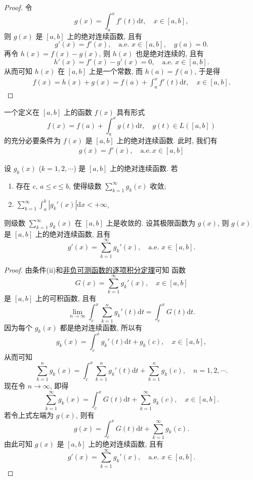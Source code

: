 \documentclass[../../main.tex]{subfiles}%
\begin{document}
\begin{proof}
令
\[
g(x) = \int_a^x f'(t)\mathrm{d}t,\quad x\in[a,b],
\]
则 $g(x)$ 是 $[a,b]$ 上的绝对连续函数, 且有
\[
g'(x) = f'(x),\quad \text{a.e. } x\in[a,b],\quad g(a)=0.
\]
再令 $h(x)=f(x)-g(x)$, 则 $h(x)$ 也是绝对连续的, 且有
\[
h'(x) = f'(x)-g'(x) = 0,\quad \text{a.e. } x\in[a,b].
\]
从而可知 $h(x)$ 在 $[a,b]$ 上是一个常数, 而 $h(a)=f(a)$, 于是得
\begin{align*}
f(x) = h(x)+g(x) 
= f(a) + \int_a^x f'(t)\mathrm{d}t,\quad x\in[a,b].
\end{align*}
\end{proof}

\begin{corollary}[Lebesgue微积分基本定理]\label{corollary:Lebesgue微积分基本定理}
一个定义在 $[a,b]$ 上的函数 $f(x)$ 具有形式
\[
f(x) = f(a) + \int_a^x g(t)\mathrm{d}t,\quad g(t)\in L([a,b])
\]
的充分必要条件为 $f(x)$ 是 $[a,b]$ 上的绝对连续函数. 此时, 我们有
\begin{align*}
g(x)=f' (x),\quad \mathrm{a}.\mathrm{e}.\,x\in [a,b]
\end{align*}
\end{corollary}

\begin{proposition}
设 $g_k(x)$ ($k=1,2,\cdots$) 是 $[a,b]$ 上的绝对连续函数. 若
\begin{enumerate}[(1)]
\item 存在 $c$, $a\leqslant c\leqslant b$, 使得级数 $\sum_{k=1}^\infty g_k(c)$ 收敛;
\item $\sum_{k=1}^\infty \int_a^b |g_k'(x)|\mathrm{d}x < +\infty$,
\end{enumerate}
则级数 $\sum_{k=1}^\infty g_k(x)$ 在 $[a,b]$ 上是收敛的. 设其极限函数为 $g(x)$, 则 $g(x)$ 是 $[a,b]$ 上的绝对连续函数, 且有
\[
g'(x) = \sum_{k=1}^\infty g_k'(x),\quad \text{a.e. } x\in[a,b].
\]
\end{proposition}
\begin{proof}
由条件(ii)和\hyperref[theorem:非负可测函数的逐项积分定理]{非负可测函数的逐项积分定理}可知 函数
\[
G(x) = \sum_{k=1}^\infty g_k'(x),\quad x\in[a,b]
\]
是 $[a,b]$ 上的可积函数, 且有
\[
\lim_{n\to\infty} \int_c^x \sum_{k=1}^n g_k'(t)\mathrm{d}t = \int_c^x G(t)\mathrm{d}t.
\]
因为每个 $g_k(x)$ 都是绝对连续函数, 所以有
\[
g_k(x) = \int_c^x g_k'(t)\mathrm{d}t + g_k(c),\quad x\in[a,b],
\]
从而可知
\[
\sum_{k=1}^n g_k(x) = \int_c^x \sum_{k=1}^n g_k'(t)\mathrm{d}t + \sum_{k=1}^n g_k(c),\quad n=1,2,\cdots.
\]
现在令 $n\to\infty$, 即得
\[
\sum_{k=1}^\infty g_k(x) = \int_c^x G(t)\mathrm{d}t + \sum_{k=1}^\infty g_k(c),\quad x\in[a,b].
\]
若令上式左端为 $g(x)$, 则有
\[
g(x) = \int_c^x G(t)\mathrm{d}t + \sum_{k=1}^\infty g_k(c).
\]
由此可知 $g(x)$ 是 $[a,b]$ 上的绝对连续函数, 且有
\[
g'(x) = \sum_{k=1}^\infty g_k'(x),\quad \text{a.e. } x\in[a,b].
\]
\end{proof}
\end{document}
